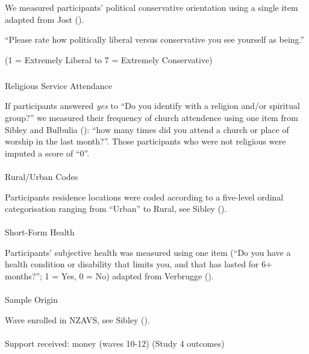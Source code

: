 \documentclass[
  single column]{article}
\makeatletter
\let\oldparagraph\paragraph
\renewcommand{\paragraph}{
    \@ifstar
      \xxxParagraphStar
      \xxxParagraphNoStar
  }
\newcommand{\xxxParagraphStar}[1]{\oldparagraph*{#1}\mbox{}}
\newcommand{\xxxParagraphNoStar}[1]{\oldparagraph{#1}\mbox{}}
\let\oldsubparagraph\subparagraph
\renewcommand{\subparagraph}{
    \@ifstar
      \xxxSubParagraphStar
      \xxxSubParagraphNoStar
  }
\newcommand{\xxxSubParagraphStar}[1]{\oldsubparagraph*{#1}\mbox{}}
\newcommand{\xxxSubParagraphNoStar}[1]{\oldsubparagraph{#1}\mbox{}}
\makeatother
\begin{document}
We measured participants' political conservative orientation using a
single item adapted from Jost ().

``Please rate how politically liberal versus conservative you see
yourself as being.''

(1 = Extremely Liberal to 7 = Extremely Conservative)

\subparagraph{Religious Service
Attendance}\label{religious-service-attendance}

If participants answered \emph{yes} to ``Do you identify with a religion
and/or spiritual group?'' we measured their frequency of church
attendence using one item from Sibley and Bulbulia
(): ``how many times did you attend a
church or place of worship in the last month?''. Those participants who
were not religious were imputed a score of ``0''.

\paragraph{Rural/Urban Codes}\label{ruralurban-codes}

Participants residence locations were coded according to a five-level
ordinal categorisation ranging from ``Urban'' to Rural, see Sibley
().

\paragraph{Short-Form Health}\label{short-form-health}

Participants' subjective health was measured using one item (``Do you
have a health condition or disability that limits you, and that has
lasted for 6+ months?''; 1 = Yes, 0 = No) adapted from Verbrugge
().

\paragraph{Sample Origin}\label{sample-origin}

Wave enrolled in NZAVS, see Sibley ().

\paragraph{Support received: money (waves 10-12) (Study 4
outcomes)}\label{support-received-money-waves-10-12-study-4-outcomes}
\end{document}
